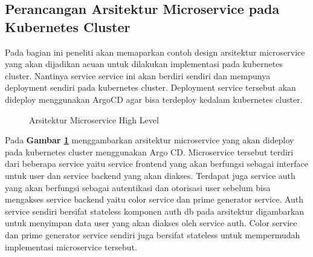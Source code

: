 \subsection{Perancangan Arsitektur Microservice pada Kubernetes Cluster}
Pada bagian ini peneliti akan memaparkan contoh design arsitektur microservice
yang akan dijadikan acuan untuk dilakukan implementasi pada kubernetes cluster.
Nantinya service service ini akan berdiri sendiri dan mempunya deployment
sendiri pada kubernetes cluster. Deployment service tersebut akan dideploy
menggunakan ArgoCD agar bisa terdeploy kedalam kubernetes cluster.
\begin{figure}[H]
  \centering
  \caption{Arsitektur Microservice High Level}
  \label{fig:arsitektur_microservice_high_level}
\end{figure}

Pada \textbf{Gambar \ref{fig:arsitektur_microservice_high_level}} menggambarkan
arsitektur microservice yang akan dideploy pada kubernetes cluster menggunakan
Argo CD. Microservice tersebut terdiri dari beberapa service yaitu service
frontend yang akan berfungsi sebagai interface untuk user dan service backend
yang akan diakses. Terdapat juga service auth yang akan berfungsi sebagai
autentikasi dan otorisasi user sebelum bisa mengakses service backend yaitu
color service dan prime generator service. Auth service sendiri bersifat
stateless komponen auth db pada arsitektur digambarkan untuk menyimpan data
user yang akan diakses oleh service auth. Color service dan prime generator
service sendiri juga bersifat stateless untuk mempermudah implementasi
microservice tersebut.

